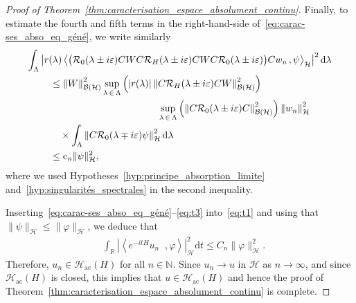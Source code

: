 \documentclass[AHL,Unicode,longabstracts,published]{cedram}
\newcommand{\Hi}{\mathcal{H}}
\newcommand{\R}{\mathbb{R}}
\newcommand{\N}{\mathbb{N}}
\newcommand{\acr}{\mathrm{ac}}
\newcommand{\rmc}{\mathrm{c}}
\newcommand{\rmd}{\mathrm{d}}
\newcommand{\norme}[1]{\left\Vert #1\right\Vert}
\newcommand{\scal}[2]{\left\langle{#1} \middle., {#2}\right\rangle}
\newcommand{\abso}[1]{\left|{#1}\right|}
\newcommand{\Res}{\mathcal{R}}
\newcommand{\clB}{\mathcal{B}}
\newcommand{\Hi}{\mathcal{H}}
\newcommand{\R}{\mathbb{R}}
\newcommand{\acr}{\mathrm{ac}}
\begin{document}
\begin{proof}[Proof of Theorem~\ref{thm:caracterisation_espace_absolument_continu}]
Finally, to estimate the fourth and fifth terms in the right-hand-side of~\eqref{eq:carac-ses_abso_eq_géné}, we write similarly
\begin{multline}\label{eq:t3}
\int_\Lambda\abso{r(\lambda)\scal{\big(\Res_0(\lambda\pm i\varepsilon)CWC\Res_H(\lambda\pm i\varepsilon)CWC\Res_0(\lambda\pm i\varepsilon)\big)Cw_n}{\psi}_\Hi}^2\rmd \lambda\\
\begin{aligned}
&\leq \norme{W}_{\clB(\Hi)}^2\sup_{\lambda\,\in\,\Lambda}\left(|r(\lambda)|\norme{C\Res_H(\lambda\pm i\varepsilon)CW}_{\clB(\Hi)}^2\right)
\\&\mkern200mu \sup_{\lambda\,\in\,\Lambda}\left(\norme{C\Res_0(\lambda\pm i\varepsilon)C}_{\clB(\Hi)}^2\right)\norme{w_n}^2_{\Hi} \\
&\quad\times\int_\Lambda\norme{C\Res_0(\lambda\mp i\varepsilon)\psi}_\Hi^2\rmd \lambda\\
&\leq \rmc_n\|\psi\|^2_\Hi,
\end{aligned}
\end{multline}
where we used Hypotheses~\ref{hyp:principe_absorption_limite} and~\ref{hyp:singularités_spectrales} in the second inequality.

Inserting~\eqref{eq:carac-ses_abso_eq_géné}--\eqref{eq:t3} into~\eqref{eq:t1} and using that $\|\psi\|_\Hi\le\|\varphi\|_\Hi$, we deduce that
\begin{align*}
&\int_\R\abso{\scal{e^{-itH}u_n}{\varphi}}_\Hi^2\rmd t \le C_n\|\varphi\|^2_\Hi.
\end{align*}
Therefore, $u_n\in\Hi_{\acr}(H)$ for all $n\in\N$. Since $u_n\to u$ in $\Hi$ as $n\to\infty$, and since $\Hi_{\acr}(H)$ is closed, this implies that $u\in\Hi_{\acr}(H)$ and hence the proof of Theorem~\ref{thm:caracterisation_espace_absolument_continu}  is complete.
\end{proof}
\end{document}
